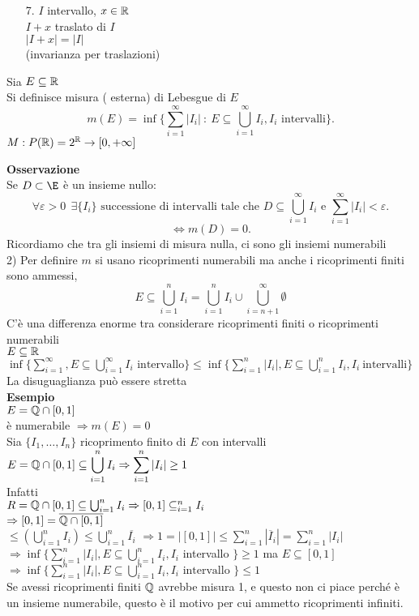 \documentclass{article}
\begin{document}
	   \begin{itemize}
	   \item[7.]	$I$ intervallo, $x\in\mathbb{R}$\\
		    $I + x$ traslato di $I$ \\
		    $|I+x| = |I|$\\
		    (invarianza per traslazioni)
	   \end{itemize}
	   \begin{defi}
	Sia $E\subseteq \mathbb{R}$\\
	Si definisce misura ( esterna) di Lebesgue di $E$ 
	\[
		m(E) = \inf\lbrace\sum ^\infty_{i=1} |I_i|\  :\ E\subseteq \bigcup^\infty_{i=1} I_i, I_i \text { intervalli}\rbrace
	.\] 
	$M:P(\mathbb{R}) = 2^{\mathbb{R}} \rightarrow [0,+\infty]$
\end{defi}
\textbf{Osservazione}\\
Se $D\subset \E$ è un insieme nullo:
\[
	\forall \varepsilon >0\ \ \exists \{I_i\} \text{ successione di intervalli tale che }  D\subseteq\bigcup^\infty_{i=1}I_i \text { e } \sum^\infty_{i=1}|I_i| < \varepsilon
.\]
\[
	\Leftrightarrow m(D) = 0
.\] 
Ricordiamo che tra gli insiemi di misura nulla, ci sono gli insiemi numerabili\\
2) Per definire $m$ si usano ricoprimenti numerabili ma anche i ricoprimenti finiti sono ammessi,
\[ E\subseteq \bigcup^n_{i=1}I_i = \bigcup^n_{i=1}I_i\cup\bigcup^\infty_{i = n+1}\emptyset\]
C'è una differenza enorme tra considerare ricoprimenti finiti o ricoprimenti numerabili\\
$E\subseteq \mathbb{R}$\\
$\inf\{ \sum^\infty_{i=1}, E\subseteq\bigcup^\infty_{i=1}I_i \text { intervallo}\}\leq \inf\{ \sum^n_{i=1}|I_i|, E\subseteq\bigcup^n_{i=1}I_i, I_i\ \text{intervalli}\}$\\
La disuguaglianza può essere stretta\\
\textbf{Esempio}\\
$E = \mathbb{Q}\cap[0,1]$\\
è numerabile  $ \Rightarrow m(E) = 0$ \\
Sia $\{I_1,\ldots,I_n\}$ ricoprimento finito di $E$ con intervalli\\
$\displaystyle E  = \mathbb{Q}\cap[0,1]\subseteq \bigcup^n_{i=1}I_i \Rightarrow \sum^n_{i=1}|I_i|\geq 1$ \\
Infatti\\
$R = \mathbb{Q}\cap[0,1]\subseteq\bigcup^n_{i=1}I_i \Rightarrow [0,1]\subseteq^n_{i=1}I_i$ \\
$ \Rightarrow [0,1]=\overline{\mathbb{Q}\cap[0,1]}$ \\
$\displaystyle\leq (\bigcup^n_{i=1}I_i)\leq \bigcup^n_{i=1}\overline{I_i}$
$ \Rightarrow 1 = |[0,1]| \leq \sum^n_{i=1} |\overline I_i| = \sum^n_{i=1}|I_i|$ \\
$ \displaystyle\Rightarrow \inf\{ \sum^n_{i=1}|I_i|, E\subseteq \bigcup_{i=1}^n I_i, I_i $ intervallo $\} \geq 1$ ma  $E\subseteq [0,1]$\\
$ \displaystyle\Rightarrow \inf\{\sum^n_{i=1}|I_i|, E\subseteq \bigcup_{i=1}^n I_i, I_i\text{ intervallo }\}\leq 1$ \\
Se avessi ricoprimenti finiti $\mathbb{Q}$ avrebbe misura 1, e questo non ci piace perché è un insieme numerabile, questo è il motivo per cui ammetto ricoprimenti infiniti.
\end{document}
